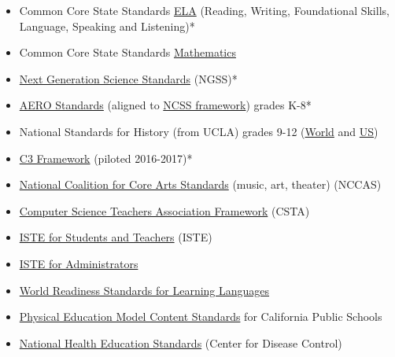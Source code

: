 \documentclass{report}
\begin{document}
\begin{findings}
\begin{itemize}
\item Common Core State Standards \href{https://drive.google.com/a/cmis.ac.th/file/d/0B71_pYxcTLo-Y1FGYl9JeUotbXc/view?usp=sharing}{ELA} (Reading, Writing, Foundational Skills, Language, Speaking and Listening)*
\item Common Core State Standards \href{https://drive.google.com/drive/folders/0B71_pYxcTLo-MkJPLU5tQk1ySWM?usp=sharing}{Mathematics}
\item \href{https://drive.google.com/drive/folders/0ByVFfrm0zfolN01lX0hnejZ4Q0U?usp=sharing}{Next Generation Science Standards} (NGSS)*
\item \href{https://drive.google.com/drive/folders/0ByVFfrm0zfolMjlnc0JtcVRVYjA?usp=sharing}{AERO Standards} (aligned to \href{http://www.socialstudies.org/standards/strands}{NCSS framework}) grades K-8*
\item National Standards for History (from UCLA) grades 9-12 (\href{http://www.nchs.ucla.edu/history-standards/world-history-content-standards}{World} and \href{http://www.nchs.ucla.edu/history-standards/us-history-content-standards}{US})
\item \href{https://drive.google.com/a/cmis.ac.th/file/d/0ByVFfrm0zfolbG9hN21kR2FXZVU/view?usp=sharing}{C3 Framework} (piloted 2016-2017)*
\item \href{https://drive.google.com/drive/folders/0B71_pYxcTLo-NDhTcTJLQU82WVU?usp=sharing}{National Coalition for Core Arts Standards} (music, art, theater)  (NCCAS)
\item \href{https://drive.google.com/a/cmis.ac.th/file/d/0B71_pYxcTLo-U1BYR3JXMUZhUW8/view?usp=sharing}{Computer Science Teachers Association Framework} (CSTA)
\item \href{https://drive.google.com/a/cmis.ac.th/file/d/0ByVFfrm0zfolakw5TUstQ1ZrVDFCRjR1d1JQSUpQbkZaVDBr/view?usp=sharing}{ISTE for Students and Teachers} (ISTE)
\item \href{https://www.iste.org/standards/standards/standards-for-administrators}{ISTE for Administrators} 
\item \href{https://drive.google.com/drive/folders/0ByVFfrm0zfolfk9CLWctcnk2RlJYX1RaWGpkZktWRTR2MVQ5aEQ0SGg0R280VGV5Tm81bm8?usp=sharing}{World Readiness Standards for Learning Languages}
\item \href{https://drive.google.com/a/cmis.ac.th/file/d/0ByVFfrm0zfolOE8wcTR5Y19BZms/view?usp=sharing}{Physical Education Model Content Standards} for California Public Schools 
\item \href{https://drive.google.com/drive/folders/0ByVFfrm0zfolfmJGZ3B1anNJc0hNTTZobHlKMXBFbTlDQUVvMXNQQVhUWklocUd0VGY3eTg?usp=sharing}{National Health Education Standards} (Center for Disease Control)

\end{itemize}
\end{findings}
\end{document}
